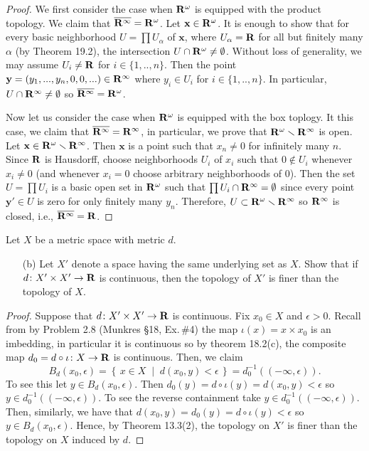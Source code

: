 \begin{proof}
We first consider the case when $\mathbf{R}^\omega$ is equipped with the
product topology. We claim that
$\overline{\mathbf{R}^\infty}=\mathbf{R}^\omega$. Let $\mathbf{x}\in\mathbf{R}^\omega$. It
is enough to show that for every basic neighborhood $U=\prod
U_\alpha$ of $\mathbf{x}$, where $U_\alpha=\mathbf{R}$ for all but
finitely many $\alpha$ (by Theorem 19.2), the intersection
$U\cap\mathbf{R}^\omega \neq\emptyset$. Without loss of generality, we
may assume $U_i\neq\mathbf{R}$ for $i\in\{1,..,n\}$. Then the point
$\mathbf{y}=(y_1,...,y_n,0,0,...)\in \mathbf{R}^\infty$ where
$y_i\in U_i$ for $i\in\{1,..,n\}$. In particular,
$U\cap\mathbf{R}^\infty\neq\emptyset$ so
$\overline{\mathbf{R}^\infty}=\mathbf{R}^\omega$.

Now let us consider the case when $\mathbf{R}^\omega$ is equipped with
the box toplogy. It this case, we claim that
$\overline{\mathbf{R}^\infty}=\mathbf{R}^\infty$, in particular, we prove that
$\mathbf{R}^\omega\smallsetminus\mathbf{R}^\infty$ is open. Let
$\mathbf{x}\in\mathbf{R}^\omega\smallsetminus\mathbf{R}^\infty$. Then $\mathbf{x}$
is a point such that $x_n\neq 0$ for infinitely
many $n$. Since $\mathbf{R}$ is Hausdorff, choose neighborhoods
$U_i$ of $x_i$ such that $0\notin U_i$ whenever
$x_i\neq 0$ (and whenever $x_i=0$ choose arbitrary neighborhoods
of $0$). Then the set $U=\prod U_i$ is a basic open set in
$\mathbf{R}^\omega$ such that $\prod U_i\cap\mathbf{R}^\infty=\emptyset$ since
every point $\mathbf{y}'\in U$ is zero for only finitely
many $y_n$. Therefore, $U\subset\mathbf{R}^\omega\smallsetminus\mathbf{R}^\infty$ so
$\mathbf{R}^\infty$ is closed, i.e., $\overline{\mathbf{R}^\infty}=\mathbf{R}$.
\end{proof}
\newpage
\begin{problem}[Munkres \S20, p.\,126, \#3(b)]
Let $X$ be a metric space with metric $d$.
\begin{enumerate}[noitemsep]
\item[(b)] Let $X'$ denote a space having the same underlying set
  as $X$. Show that if $d\colon X'\times X'\to\mathbf{R}$ is continuous,
  then the topology of $X'$ is finer than the topology of $X$.
\end{enumerate}
\end{problem}
\begin{proof}
Suppose that $d\colon X'\times X'\to\mathbf{R}$ is continuous. Fix
$x_0\in X$ and $\epsilon>0$. Recall from by Problem 2.8 (Munkres
\S18, Ex.\,\#4) the map $\iota(x)=x\times x_0$ is an imbedding,
in particular it is continuous so by theorem 18.2(c), the
composite map $d_0=d\circ\iota\colon X\to\mathbf{R}$ is
continuous. Then, we claim
\[
B_d(x_0,\epsilon)=\left\{\,x\in
  X\;\middle|\;d(x_0,y)<\epsilon\,\right\}=d_0^{-1}((-\infty,\epsilon)).
\]
To see this let $y\in B_d(x_0,\epsilon)$. Then
$d_0(y)=d\circ\iota(y)=d(x_0,y)<\epsilon$ so $y\in
d_0^{-1}((-\infty,\epsilon))$. To see the reverse containment
take $y\in d_0^{-1}((-\infty,\epsilon))$. Then, similarly, we
have that $d(x_0,y)=d_0(y)=d\circ\iota(y)<\epsilon$ so $y\in
B_d(x_0,\epsilon)$. Hence, by Theorem 13.3(2), the topology on
$X'$ is finer than the topology on $X$ induced by $d$.
\end{proof}
